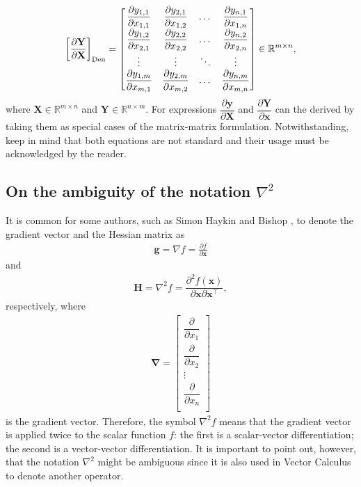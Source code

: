 \documentclass{article}
\begin{document}
\begin{align}
    \left[\frac{\partial \mathbf{Y}}{\partial\mathbf{X}}\right]_{\textnormal{Den}} = \begin{bmatrix}
        \dfrac{\partial y_{1,1}}{\partial x_{1,1}} & \dfrac{\partial y_{2,1}}{\partial x_{1,2}} & \dots & \dfrac{\partial y_{n,1}}{\partial x_{1,n}} \\
        \dfrac{\partial y_{1,2}}{\partial x_{2,1}} & \dfrac{\partial y_{2,2}}{\partial x_{2,2}} & \dots & \dfrac{\partial y_{n,2}}{\partial x_{2,n}} \\
        \vdots & \vdots & \ddots & \vdots \\
        \dfrac{\partial y_{1,m}}{\partial x_{m,1}} & \dfrac{\partial y_{2,m}}{\partial x_{m,2}} & \dots & \dfrac{\partial y_{n,m}}{\partial x_{m,n}} \\
    \end{bmatrix} \in \mathbb{R}^{m \times n},
\end{align}
where \(\mathbf{X}\in \mathbb{R}^{m\times n}\) and \(\mathbf{Y} \in \mathbb{R}^{n\times m}\). For expressions \(\dfrac{\partial \mathbf{y}}{\partial \mathbf{X}}\) and \(\dfrac{\partial \mathbf{Y}}{\partial \mathbf{x}}\) can the derived by taking them as special cases of the matrix-matrix formulation. Notwithstanding, keep in mind that both equations are not standard and their usage must be acknowledged by the reader.

\subsection{On the ambiguity of the notation \(\nabla^2\)}

It is common for some authors, such as Simon Haykin \cite{haykin2009neural} and Bishop \cite{bishopPatternRecognitionMachine2006}, to denote the gradient vector and the Hessian matrix as
\begin{align}
    \mathbf{g} = \nabla f = \frac{\partial f}{\partial \mathbf{x}}
\end{align}
and
\begin{align}
    \mathbf{H} = \nabla^{2} f = \dfrac{\partial^{2} f(\mathbf{x})}{\partial\mathbf{x}\partial\mathbf{x}^\top},
    \label{eq:H-nabla}
\end{align}
respectively, where
\begin{align}
    \mathbf{\nabla} = \begin{bmatrix}
        \dfrac{\partial}{\partial x_1} \\
        \dfrac{\partial}{\partial x_2} \\
        \vdots \\
        \dfrac{\partial}{\partial x_n} \\
    \end{bmatrix}
\end{align}
is the gradient vector. Therefore, the symbol \(\nabla^2 f\) means that the gradient vector is applied twice to the scalar function \(f\): the first is a scalar-vector differentiation; the second is a vector-vector differentiation. It is important to point out, however, that the notation \(\nabla^{2}\) might be ambiguous since it is also used in Vector Calculus to denote another operator.
\end{document}

